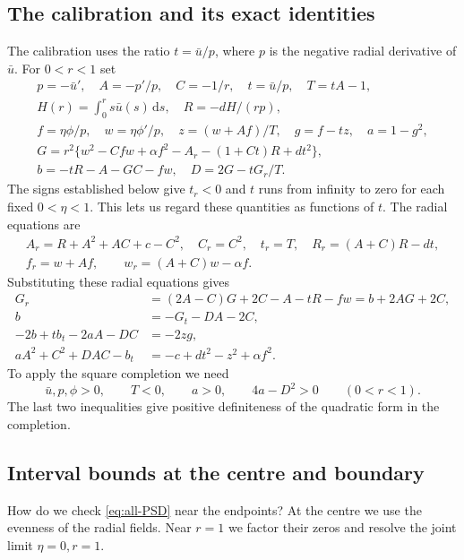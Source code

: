 \documentclass[a4paper,11pt]{amsart}
\numberwithin{equation}{section}
\theoremstyle{plain}
\theoremstyle{definition}
\newcommand{\dd}{\,\mathrm d}
\begin{document}
\subsection{The calibration and its exact identities}

The calibration uses the ratio \(t=\bar u/p\), where \(p\) is
the negative radial derivative of \(\bar u\). For \(0<r<1\) set
\begin{gather*}
 p=-\bar u',\quad A=-p'/p,\quad C=-1/r,\quad
 t=\bar u/p,\quad T=tA-1,\\
 H(r)=\int_0^r s\bar u(s)\dd s,\quad R=-dH/(rp),\\
 f=\eta\phi/p,\quad w=\eta\phi'/p,\quad
 z=(w+Af)/T,\quad g=f-tz,\quad a=1-g^2,\\
 G=r^2\{w^2-Cfw+\alpha f^2-A_r-(1+Ct)R+dt^2\},\\
 b=-tR-A-GC-fw,\quad D=2G-tG_r/T.
\end{gather*}
The signs established below give \(t_r<0\) and \(t\) runs from
infinity to zero for each fixed \(0<\eta<1\). This lets us regard
these quantities as functions of \(t\). The radial equations are
\begin{gather*}
 A_r=R+A^2+AC+c-C^2,\quad C_r=C^2,\quad t_r=T,\quad
 R_r=(A+C)R-dt,\\
 f_r=w+Af,\qquad w_r=(A+C)w-\alpha f.
\end{gather*}
Substituting these radial equations gives
\begin{align}
 G_r&=(2A-C)G+2C-A-tR-fw=b+2AG+2C,\nonumber\\
 b&=-G_t-DA-2C,\nonumber\\
 -2b+tb_t-2aA-DC&=-2zg,\label{eq:all-identities}\\
 aA^2+C^2+DAC-b_t&=-c+dt^2-z^2+\alpha f^2.\nonumber
\end{align}
To apply the square completion we need
\begin{equation}\label{eq:all-PSD}
 \bar u,p,\phi>0,\qquad T<0,\qquad
 a>0,\qquad 4a-D^2>0\qquad(0<r<1).
\end{equation}
The last two inequalities give positive definiteness of the
quadratic form in the completion.

\subsection{Interval bounds at the centre and boundary}

How do we check \eqref{eq:all-PSD} near the endpoints? At the
centre we use the evenness of the radial fields. Near \(r=1\) we
factor their zeros and resolve the joint limit \(\eta=0,r=1\).
\end{document}
